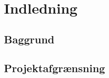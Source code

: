 \chapter{Indledning} 

\section{Baggrund}

\section{Projektafgrænsning}
 
    	
\label{version_Systemark}

